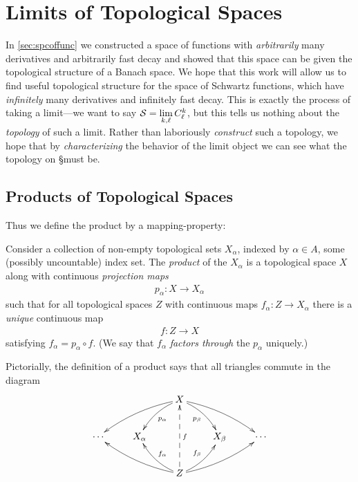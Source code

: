    \section{Limits of Topological Spaces}
      
      \noindent
      In \autoref{sec:spcoffunc} we constructed a space of functions with \emph{arbitrarily} many derivatives and arbitrarily fast decay and showed that this space can be given the topological structure of a Banach space.
      We hope that this work will allow us to find useful topological structure for the space of Schwartz functions, which have \emph{infinitely} many derivatives and infinitely fast decay.
      This is exactly the process of taking a limit---we want to say $\S=\lim\limits_{k,\ell}C^k_\ell$, but this tells us nothing about the \emph{topology} of such a limit.
      Rather than laboriously \emph{construct} such a topology, we hope that by \emph{characterizing} the behavior of the limit object we can see what the topology on \S must be.

      \subsection{Products of Topological Spaces}
        Thus we define the product by a mapping-property:
        \begin{defn}
          Consider a collection of non-empty topological sets $X_\alpha$, indexed by $\alpha\in A$, some (possibly uncountable) index set.
          The \emph{product} of the $X_\alpha$ is a topological space $X$ along with continuous \emph{projection maps} 
          \begin{align*}
            p_\alpha:X\longrightarrow X_\alpha
          \end{align*}
          such that for all topological spaces $Z$ with continuous maps $f_\alpha:Z\rightarrow X_\alpha$ there is a \emph{unique} continuous map 
          \begin{align*}
            f:Z\longrightarrow X
          \end{align*}
          satisfying $f_\alpha=p_\alpha\circ f$.
          (We say that $f_\alpha$ \emph{factors through} the $p_\alpha$ uniquely.)
        \end{defn}
        Pictorially, the definition of a product says that all triangles commute in the diagram
        \begin{displaymath}
          \xymatrix{
            && X \ar@/_/[dll] \ar@/_/[dl]^{p_\alpha} \ar@/^/[dr]_{p_\beta} \ar@/^/[drr] \\
            \cdots & X_\alpha && X_\beta & \cdots\\
            && Z \ar@/^/[ull] \ar@/^/[ul]_{f_\alpha} \ar@{-->}[uu]_f \ar@/_/[ur]^{f_\beta} \ar@/_/[urr]
           }
        \end{displaymath}

